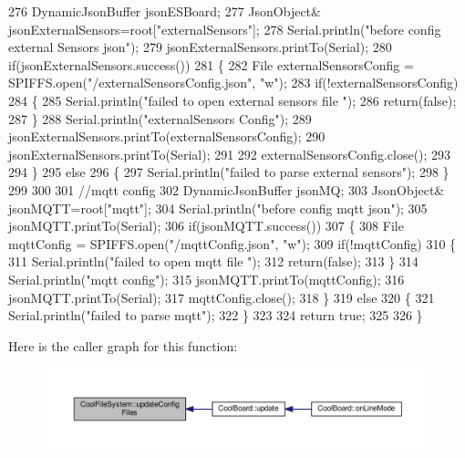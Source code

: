 \begin{DoxyCode}
276     DynamicJsonBuffer jsonESBoard;
277         JsonObject& jsonExternalSensors=root[\textcolor{stringliteral}{"externalSensors"}];
278     Serial.println(\textcolor{stringliteral}{"before config external Sensors json"});
279     jsonExternalSensors.printTo(Serial);
280     \textcolor{keywordflow}{if}(jsonExternalSensors.success())
281     \{
282         File externalSensorsConfig = SPIFFS.open(\textcolor{stringliteral}{"/externalSensorsConfig.json"}, \textcolor{stringliteral}{"w"});   
283         \textcolor{keywordflow}{if}(!externalSensorsConfig)
284         \{
285             Serial.println(\textcolor{stringliteral}{"failed to open external sensors file "});
286             \textcolor{keywordflow}{return}(\textcolor{keyword}{false});
287         \}
288         Serial.println(\textcolor{stringliteral}{"externalSensors Config"});
289         jsonExternalSensors.printTo(externalSensorsConfig);
290         jsonExternalSensors.printTo(Serial);
291     
292         externalSensorsConfig.close();
293 
294     \}
295     \textcolor{keywordflow}{else}
296     \{
297         Serial.println(\textcolor{stringliteral}{"failed to parse external sensors"}); 
298     \}
299 
300     
301     \textcolor{comment}{//mqtt config}
302     DynamicJsonBuffer jsonMQ;
303         JsonObject& jsonMQTT=root[\textcolor{stringliteral}{"mqtt"}];
304     Serial.println(\textcolor{stringliteral}{"before config mqtt json"});
305     jsonMQTT.printTo(Serial);
306     \textcolor{keywordflow}{if}(jsonMQTT.success())
307     \{
308         File mqttConfig = SPIFFS.open(\textcolor{stringliteral}{"/mqttConfig.json"}, \textcolor{stringliteral}{"w"}); 
309         \textcolor{keywordflow}{if}(!mqttConfig)
310         \{
311             Serial.println(\textcolor{stringliteral}{"failed to open mqtt file "});        
312             \textcolor{keywordflow}{return}(\textcolor{keyword}{false});
313         \}
314         Serial.println(\textcolor{stringliteral}{"mqtt config"});
315         jsonMQTT.printTo(mqttConfig);
316         jsonMQTT.printTo(Serial);
317         mqttConfig.close();
318     \}
319     \textcolor{keywordflow}{else}
320     \{
321         Serial.println(\textcolor{stringliteral}{"failed to parse mqtt"}); 
322     \}   
323         
324     \textcolor{keywordflow}{return} \textcolor{keyword}{true};
325 
326 \}   
\end{DoxyCode}
Here is the caller graph for this function\+:\nopagebreak
\begin{figure}[H]
\begin{center}
\leavevmode
\includegraphics[width=350pt]{classCoolFileSystem_a32dad79ae80182a83e2e8f52286b7c7b_icgraph}
\end{center}
\end{figure}


